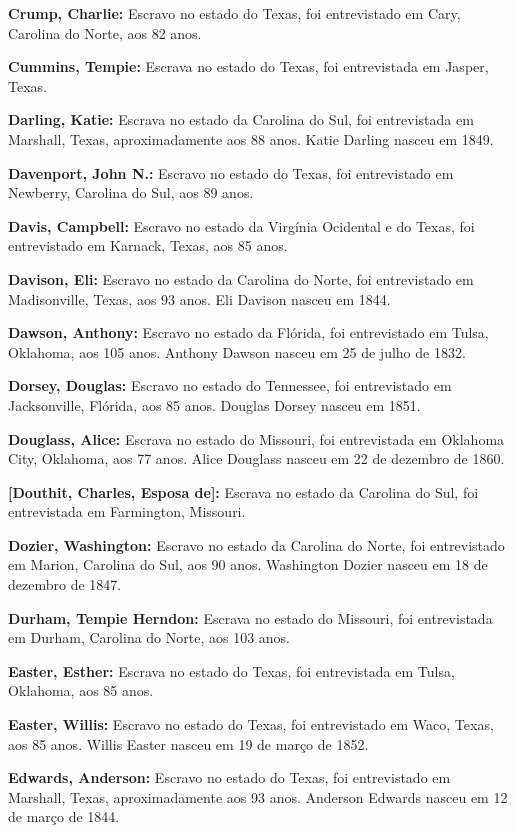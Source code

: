 \textbf{Crump, Charlie:} Escravo no estado do Texas, foi entrevistado em
Cary, Carolina do Norte, aos 82 anos.

\textbf{Cummins, Tempie:} Escrava no estado do Texas, foi entrevistada
em Jasper, Texas.

\textbf{Darling, Katie:} Escrava no estado da Carolina do Sul, foi
entrevistada em Marshall, Texas, aproximadamente aos 88 anos. Katie
Darling nasceu em 1849.

\textbf{Davenport, John N.:} Escravo no estado do Texas, foi
entrevistado em Newberry, Carolina do Sul, aos 89 anos.

\textbf{Davis, Campbell:} Escravo no estado da Virgínia Ocidental e do
Texas, foi entrevistado em Karnack, Texas, aos 85 anos.

\textbf{Davison, Eli:} Escravo no estado da Carolina do Norte, foi
entrevistado em Madisonville, Texas, aos 93 anos. Eli Davison nasceu em
1844.

\textbf{Dawson, Anthony:} Escravo no estado da Flórida, foi entrevistado
em Tulsa, Oklahoma, aos 105 anos. Anthony Dawson nasceu em 25 de julho
de 1832.

\textbf{Dorsey, Douglas:} Escravo no estado do Tennessee, foi
entrevistado em Jacksonville, Flórida, aos 85 anos. Douglas Dorsey
nasceu em 1851.

\textbf{Douglass, Alice:} Escrava no estado do Missouri, foi
entrevistada em Oklahoma City, Oklahoma, aos 77 anos. Alice Douglass
nasceu em 22 de dezembro de 1860.

\textbf{{[}Douthit, Charles, Esposa de{]}:} Escrava no estado da
Carolina do Sul, foi entrevistada em Farmington, Missouri.

\textbf{Dozier, Washington:} Escravo no estado da Carolina do Norte, foi
entrevistado em Marion, Carolina do Sul, aos 90 anos. Washington Dozier
nasceu em 18 de dezembro de 1847.

\textbf{Durham, Tempie Herndon:} Escrava no estado do Missouri, foi
entrevistada em Durham, Carolina do Norte, aos 103 anos.

\textbf{Easter, Esther:} Escrava no estado do Texas, foi entrevistada em
Tulsa, Oklahoma, aos 85 anos.

\textbf{Easter, Willis:} Escravo no estado do Texas, foi entrevistado em
Waco, Texas, aos 85 anos. Willis Easter nasceu em 19 de março de 1852.

\textbf{Edwards, Anderson:} Escravo no estado do Texas, foi entrevistado
em Marshall, Texas, aproximadamente aos 93 anos. Anderson Edwards nasceu
em 12 de março de 1844.

